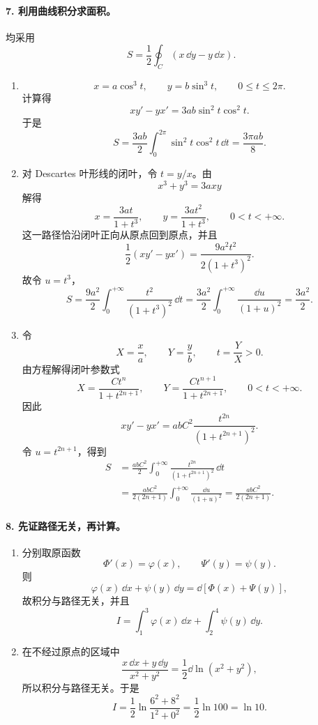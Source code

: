 \paragraph{7. 利用曲线积分求面积。}
\begin{xsolution}
均采用
\[
  S=\frac12\oint_C(x\,\dd y-y\,\dd x).
\]
\begin{enumerate}[label=(\arabic*)]
\item
\[
  x=a\cos^3t,\qquad y=b\sin^3t,\qquad0\le t\le2\pi.
\]
计算得
\[
  x y'-y x'=3ab\sin^2t\cos^2t.
\]
于是
\[
  S=\frac{3ab}{2}\int_0^{2\pi}\sin^2t\cos^2t\,\dd t
   =\frac{3\pi ab}{8}.
\]

\item 对 Descartes 叶形线的闭叶，令 $t=y/x$。由
\[
  x^3+y^3=3axy
\]
解得
\[
  x=\frac{3at}{1+t^3},
  \qquad
  y=\frac{3at^2}{1+t^3},
  \qquad0<t<+\infty.
\]
这一路径恰沿闭叶正向从原点回到原点，并且
\[
  \frac12(xy'-yx')=\frac{9a^2t^2}{2(1+t^3)^2}.
\]
故令 $u=t^3$，
\[
  S=\frac{9a^2}{2}\int_0^{+\infty}\frac{t^2}{(1+t^3)^2}\,\dd t
   =\frac{3a^2}{2}\int_0^{+\infty}\frac{\dd u}{(1+u)^2}
   =\frac{3a^2}{2}.
\]

\item 令
\[
  X=\frac xa,\qquad Y=\frac yb,
  \qquad t=\frac YX>0.
\]
由方程解得闭叶参数式
\[
  X=\frac{Ct^n}{1+t^{2n+1}},
  \qquad
  Y=\frac{Ct^{n+1}}{1+t^{2n+1}},
  \qquad0<t<+\infty.
\]
因此
\[
  xy'-yx'
  =abC^2\frac{t^{2n}}{(1+t^{2n+1})^2}.
\]
令 $u=t^{2n+1}$，得到
\begin{align*}
  S
  &=\frac{abC^2}{2}\int_0^{+\infty}
    \frac{t^{2n}}{(1+t^{2n+1})^2}\,\dd t\\
  &=\frac{abC^2}{2(2n+1)}
    \int_0^{+\infty}\frac{\dd u}{(1+u)^2}
   =\frac{abC^2}{2(2n+1)}.
\end{align*}
\end{enumerate}
\end{xsolution}

\paragraph{8. 先证路径无关，再计算。}
\begin{xsolution}
\begin{enumerate}[label=(\arabic*)]
\item 分别取原函数
\[
  \Phi'(x)=\varphi(x),\qquad \Psi'(y)=\psi(y).
\]
则
\[
  \varphi(x)\,\dd x+\psi(y)\,\dd y
  =\dd[\Phi(x)+\Psi(y)],
\]
故积分与路径无关，并且
\[
  I=\int_1^3\varphi(x)\,\dd x+
    \int_2^4\psi(y)\,\dd y.
\]

\item 在不经过原点的区域中
\[
  \frac{x\,\dd x+y\,\dd y}{x^2+y^2}
  =\frac12\dd\ln(x^2+y^2),
\]
所以积分与路径无关。于是
\[
  I=\frac12\ln\frac{6^2+8^2}{1^2+0^2}
   =\frac12\ln100=\ln10.
\]
\end{enumerate}
\end{xsolution}

